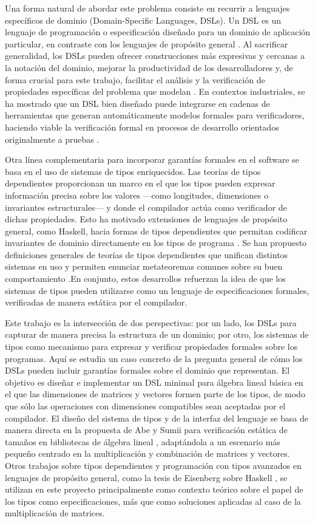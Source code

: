 \documentclass[conference]{IEEEtran}
\begin{document}
Una forma natural de abordar este problema consiste en recurrir a lenguajes específicos de dominio (Domain-Specific Languages, DSLs). Un DSL es un lenguaje de programación o especificación diseñado para un dominio de aplicación particular, en contraste con los lenguajes de propósito general \cite{mernik2005}. Al sacrificar generalidad, los DSLs pueden ofrecer construcciones más expresivas y cercanas a la notación del dominio, mejorar la productividad de los desarrolladores y, de forma crucial para este trabajo, facilitar el análisis y la verificación de propiedades específicas del problema que modelan \cite{mernik2005}. En contextos industriales, se ha mostrado que un DSL bien diseñado puede integrarse en cadenas de herramientas que generan automáticamente modelos formales para verificadores, haciendo viable la verificación formal en procesos de desarrollo orientados originalmente a pruebas \cite{eakman2015}.

Otra línea complementaria para incorporar garantías formales en el software se basa en el uso de sistemas de tipos enriquecidos. Las teorías de tipos dependientes proporcionan un marco en el que los tipos pueden expresar información precisa sobre los valores —como longitudes, dimensiones o invariantes estructurales— y donde el compilador actúa como verificador de dichas propiedades. Esto ha motivado extensiones de lenguajes de propósito general, como Haskell, hacia formas de tipos dependientes que permitan codificar invariantes de dominio directamente en los tipos de programa \cite{eisenberg2016}. Se han propuesto definiciones generales de teorías de tipos dependientes que unifican distintos sistemas en uso y permiten enunciar metateoremas comunes sobre su buen comportamiento \cite{bauer2020}.En conjunto, estos desarrollos refuerzan la idea de que los sistemas de tipos pueden utilizarse como un lenguaje de especificaciones formales, verificadas de manera estática por el compilador.

Este trabajo es la intersección de dos perspectivas: por un lado, los DSLs para capturar de manera precisa la estructura de un dominio; por otro, los sistemas de tipos como mecanismo para expresar y verificar propiedades formales sobre los programas. Aquí se estudia un caso concreto de la pregunta general de cómo los DSLs pueden incluir garantías formales sobre el dominio que representan. El objetivo es diseñar e implementar un DSL minimal para álgebra lineal básica en el que las dimensiones de matrices y vectores formen parte de los tipos, de modo que sólo las operaciones con dimensiones compatibles sean aceptadas por el compilador. El diseño del sistema de tipos y de la interfaz del lenguaje se basa de manera directa en la propuesta de Abe y Sumii para verificación estática de tamaños en bibliotecas de álgebra lineal \cite{abe2015}, adaptándola a un escenario más pequeño centrado en la multiplicación y combinación de matrices y vectores. Otros trabajos sobre tipos dependientes y programación con tipos avanzados en lenguajes de propósito general, como la tesis de Eisenberg sobre Haskell \cite{eisenberg2016}, se utilizan en este proyecto principalmente como contexto teórico sobre el papel de los tipos como especificaciones, más que como soluciones aplicadas al caso de la multiplicación de matrices. 
\end{document}
